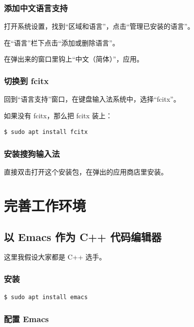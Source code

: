 \documentclass[UTF-8]{ctexart}
\begin{document}
			\subsubsection{添加中文语言支持}
			
				打开系统设置，找到“区域和语言”，点击“管理已安装的语言”。
				
				在“语言”栏下点击“添加或删除语言”。
				
				在弹出来的窗口里钩上“中文（简体）”，应用。
			
			\subsubsection{切换到 fcitx}
	
				回到“语言支持”窗口，在键盘输入法系统中，选择“fcitx”。
				
				如果没有 fcitx，那么把 fcitx 装上：
				
				\begin{verbatim}
$ sudo apt install fcitx
				\end{verbatim}
			
			\subsubsection{安装搜狗输入法}
			
				直接双击打开这个安装包，在弹出的应用商店里安装。
	
			
	\newpage
				
	\section{完善工作环境}
	
		\subsection{以 Emacs 作为 C++ 代码编辑器}
		
			这里我假设大家都是 C++ 选手。
		
			\subsubsection{安装}
		
				\begin{verbatim}
$ sudo apt install emacs
				\end{verbatim}
			
			\subsubsection{配置 Emacs}
			
\end{document}
